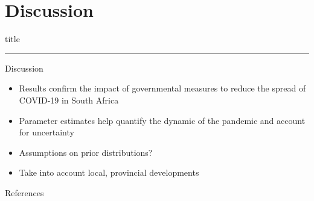 \documentclass{beamer}
\begin{document}
\section{Discussion}
    \begin{frame}[plain]
        \vfill
      \centering
      \begin{beamercolorbox}[sep=8pt,center,shadow=true,rounded=true]{title}
        \insertsectionhead\par%
        \color{oxfordblue}\noindent\rule{10cm}{1pt} 
        
      \end{beamercolorbox}
      \vfill
  \end{frame}
\begin{frame}{Discussion}
  \begin{itemize}
  	\item Results confirm the impact of governmental measures to reduce the spread of COVID-19 in South Africa
  	\item<2-> Parameter estimates help quantify the dynamic of the pandemic and account for uncertainty 
  	\item<3-> Assumptions on prior distributions?
  	\item<4-> Take into account local, provincial developments
  \end{itemize}
\end{frame}



\begin{frame}{References}


\end{frame}
\end{document}
